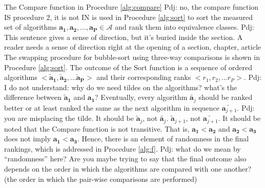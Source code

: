 \documentclass[conference]{IEEEtran}
\newcommand{\p}[1]{{\color{blue} Pdj: #1}}
\begin{document}
The Compare function in Procedure \ref{alg:compare} \p{no, the compare function IS procedure 2, it is not IN} is used in Procedure \ref{alg:sort} to sort the measured set of algorithms $\mathbf{a_1},\mathbf{a_2}, ..., \mathbf{a_P} \in \mathcal{A}$
and rank them into equivalence classes.
\p{This sentence gives a sense of direction, but it's buried inside the section. A reader needs a sense of direction
  right at the opening of a section, chapter, article}
The swapping procedure for bubble-sort using three-way comparisons is shown in
Procedure \ref{alg:sort}.
The outcome of the Sort function is a sequence of ordered algorithms $<\mathbf{\tilde{a}_1}, \mathbf{\tilde{a}_2},
... \mathbf{\tilde{a}_P}>$ and their corresponding ranks $ <r_1,r_2,...r_P> $.
\p{I do not understand: why do we need tildes on the algorithms? what's the difference between $\mathbf{\tilde{a}_1}$
  and $\mathbf{{a}_1}$?}
Eventually, every algorithm
$\tilde{\mathbf{a}_j}$ should be ranked better or at least ranked the same as the next algorithm in sequence
$\tilde{\mathbf{a}_{j+1}}$.
\p{you are misplacing the tilde. It should be $\tilde{\mathbf{a}}_j$, not $\tilde{\mathbf{a}_j}$.
  $\tilde{\mathbf{a}}_{j+1}$, not $\tilde{\mathbf{a}_{j+1}}$.}
It should be noted that the Compare function is not transitive. That is,  $\mathbf{a_1} < \mathbf{a_2}$ and
$\mathbf{a_2} < \mathbf{a_3} $ does not imply $\mathbf{a_1} < \mathbf{a_3}$. Hence, there is an element of randomness in
the final rankings, which is addressed in Procedure \ref{alg:f}. \p{what do we mean by ``randomness'' here? Are you
  maybe trying to say that the final outcome also depends on the order in which the algorithms are compared with one
  another? (the order in which the pair-wise comparisons are performed)}

\end{document}
